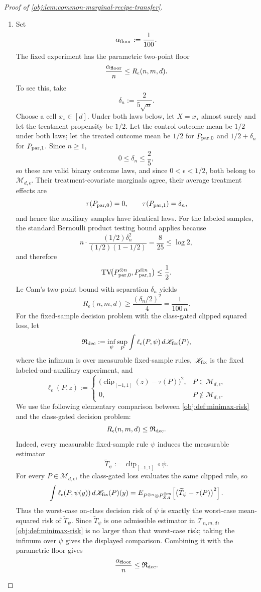 \documentclass[11pt]{article}
\begin{document}
\begin{proof}[Proof of \cref{obj:lem:common-marginal-recipe-transfer}]
\begin{enumerate}
\item Set
\[
\alpha_{\rm floor}:=\frac1{100}.
\]
The fixed experiment has the parametric two-point floor
\[
\frac{\alpha_{\rm floor}}{n}\le R_\epsilon(n,m,d).
\]
To see this, take
\[
\delta_n:=\frac{2}{5\sqrt n}.
\]
Choose a cell \(x_\star\in[d]\).  Under both laws below, let \(X=x_\star\) almost surely and let the treatment propensity be \(1/2\).  Let the control outcome mean be \(1/2\) under both laws; let the treated outcome mean be \(1/2\) for \(P_{\rm par,0}\) and \(1/2+\delta_n\) for \(P_{\rm par,1}\).  Since \(n\ge1\),
\[
0\le\delta_n\le\frac25,
\]
so these are valid binary outcome laws, and since \(0<\epsilon<1/2\), both belong to \(\mathcal M_{d,\epsilon}\).  Their treatment-covariate marginals agree, their average treatment effects are
\[
\tau(P_{\rm par,0})=0,
\qquad
\tau(P_{\rm par,1})=\delta_n,
\]
and hence the auxiliary samples have identical laws.  For the labeled samples, the standard Bernoulli product testing bound applies because
\[
n\cdot
\frac{(1/2)\delta_n^2}{(1/2)(1-1/2)}
=
\frac{8}{25}
\le \log 2,
\]
and therefore
\[
\operatorname{TV}\!\bigl(P_{\rm par,0}^{\otimes n},P_{\rm par,1}^{\otimes n}\bigr)
\le\frac12.
\]
Le Cam's two-point bound with separation \(\delta_n\) yields
\[
R_\epsilon(n,m,d)
\ge
\frac{(\delta_n/2)^2}{4}
=
\frac1{100\,n}.
\]
For the fixed-sample decision problem with the class-gated clipped squared loss, let
\[
\mathfrak R_{\rm dec}
:=
\inf_{\psi}
\sup_P
\int
\ell_\epsilon(P,\psi)\,d\mathscr K_{\rm fix}(P),
\]
where the infimum is over measurable fixed-sample rules, \(\mathscr K_{\rm fix}\) is the fixed labeled-and-auxiliary experiment, and
\[
\ell_\epsilon(P,z)
:=
\begin{cases}
\bigl(\operatorname{clip}_{[-1,1]}(z)-\tau(P)\bigr)^2,& P\in\mathcal M_{d,\epsilon},\\
0,& P\notin\mathcal M_{d,\epsilon}.
\end{cases}
\]
We use the following elementary comparison between \cref{obj:def:minimax-risk} and the class-gated decision problem:
\[
R_\epsilon(n,m,d)
\le
\mathfrak R_{\rm dec}.
\]
Indeed, every measurable fixed-sample rule \(\psi\) induces the measurable estimator
\[
\widetilde T_\psi:=\operatorname{clip}_{[-1,1]}\circ\psi .
\]
For every \(P\in\mathcal M_{d,\epsilon}\), the class-gated loss evaluates the same clipped rule, so
\[
\int \ell_\epsilon(P,\psi(y))\,d\mathscr K_{\rm fix}(P)(y)
=
E_{P^{\otimes n}\otimes P_{XA}^{\otimes m}}
\!\left[\bigl(\widetilde T_\psi-\tau(P)\bigr)^2\right].
\]
Thus the worst-case on-class decision risk of \(\psi\) is exactly the worst-case mean-squared risk of \(\widetilde T_\psi\).  Since \(\widetilde T_\psi\) is one admissible estimator in \(\mathcal T_{n,m,d}\), \cref{obj:def:minimax-risk} is no larger than that worst-case risk; taking the infimum over \(\psi\) gives the displayed comparison.  Combining it with the parametric floor gives
\[
\frac{\alpha_{\rm floor}}{n}
\le
\mathfrak R_{\rm dec}.
\] %


\end{enumerate}
\end{proof}
\end{document}
